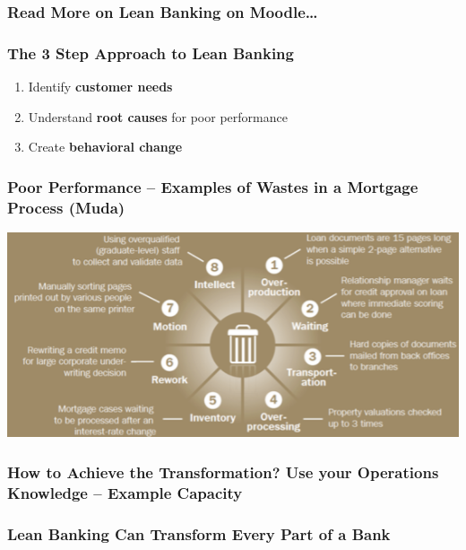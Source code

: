 \subsubsection{Read More on Lean Banking on Moodle…}
\subsubsection{The 3 Step Approach to Lean Banking}
\begin{enumerate}
	\item Identify \textbf{customer needs}
	\item Understand \textbf{root causes} for poor performance
\item Create \textbf{behavioral change}
\end{enumerate}
\subsubsection{Poor Performance – Examples of Wastes in a Mortgage Process (Muda)}
\includegraphics[width=1\textwidth]{W12/poorperformance}
\subsubsection{How to Achieve the Transformation? Use your Operations	Knowledge – Example Capacity}
\subsubsection{Lean Banking Can Transform Every Part of a Bank}
